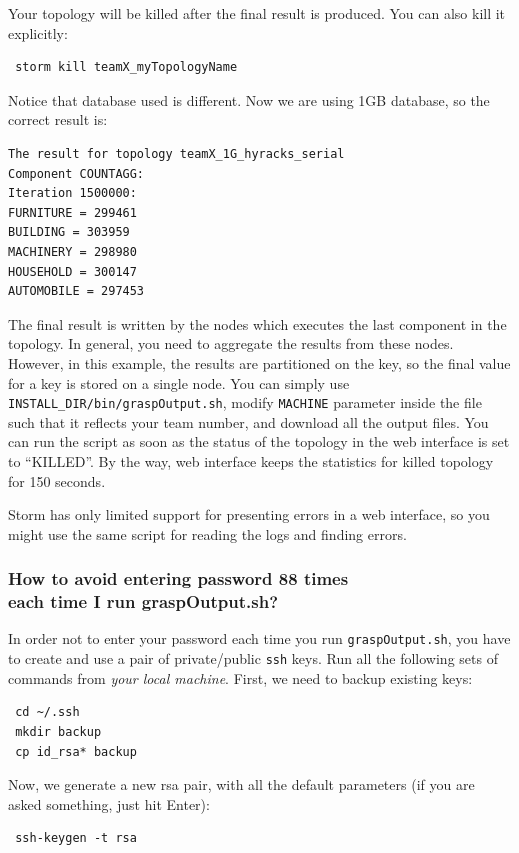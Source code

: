 \documentclass[a4paper,10pt]{article}
\begin{document}
Your topology will be killed after the final result is produced. You can also kill it explicitly:
\begin{verbatim}
 storm kill teamX_myTopologyName
\end{verbatim}

Notice that database used is different. Now we are using 1GB database, so the correct result is:
\begin{verbatim}
The result for topology teamX_1G_hyracks_serial
Component COUNTAGG:
Iteration 1500000:
FURNITURE = 299461
BUILDING = 303959
MACHINERY = 298980
HOUSEHOLD = 300147
AUTOMOBILE = 297453
\end{verbatim}

The final result is written by the nodes which executes the last component in the topology. In general, you need to aggregate the results from these nodes. However, in this example, the results are partitioned on the key, so the final value for a key is stored on a single node. You can simply use \verb#INSTALL_DIR/bin/graspOutput.sh#, modify \verb#MACHINE# parameter inside the file such that it reflects your team number, and download all the output files. You can run the script as soon as the status of the topology in the web interface is set to ``KILLED''. By the way, web interface keeps the statistics for killed topology for 150 seconds. 

Storm has only limited support for presenting errors in a web interface, so you might use the same script for reading the logs and finding errors.

\subsubsection{How to avoid entering password 88 times \\ each time I run graspOutput.sh?} In order not to enter your password each time you run \verb#graspOutput.sh#, you have to create and use a pair of private/public \verb|ssh| keys. Run all the following sets of commands from \textit{your local machine}. First, we need to backup existing keys:
\begin{verbatim}
 cd ~/.ssh
 mkdir backup
 cp id_rsa* backup
\end{verbatim}
Now, we generate a new rsa pair, with all the default parameters (if you are asked something, just hit Enter):
\begin{verbatim}
 ssh-keygen -t rsa
\end{verbatim}
\end{document}
